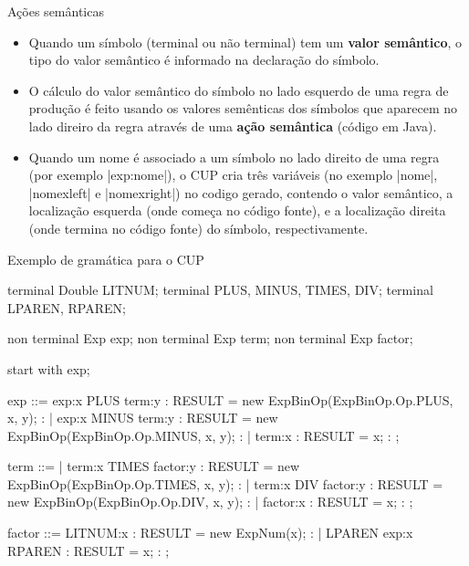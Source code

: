\documentclass[smaller]{beamer}
\begin{document}
\begin{frame}{Ações semânticas}
  \begin{itemize}
    \item Quando um símbolo (terminal ou não terminal) tem um
    \textbf{valor semântico}, o tipo do valor semântico é informado na
    declaração do símbolo.
    \item O cálculo do valor semântico do símbolo no lado esquerdo de
    uma regra de produção é feito usando os valores semênticas dos
    símbolos que aparecem no lado direiro da regra através de uma
    \textbf{ação semântica} (código em Java).
    \item Quando um \alert{nome} é associado a um símbolo no lado
    direito de uma regra (por exemplo \pyginline|exp:nome|), o CUP
    cria três variáveis (no exemplo \pyginline|nome|,
    \pyginline|nomexleft| e \pyginline|nomexright|) no codigo gerado,
    contendo o valor semântico, a localização esquerda (onde começa no
    código fonte), e a localização direita (onde termina no código
    fonte) do símbolo, respectivamente.
  \end{itemize}
\end{frame}


\begin{frame}{Exemplo de gramática para o CUP}
  \scriptsize
\begin{pygmented}[]
terminal Double LITNUM;
terminal        PLUS, MINUS, TIMES, DIV;
terminal        LPAREN, RPAREN;

non terminal Exp exp;
non terminal Exp term;
non terminal Exp factor;

start with exp;

exp ::=
  exp:x PLUS term:y      {: RESULT = new ExpBinOp(ExpBinOp.Op.PLUS, x, y);  :}
| exp:x MINUS term:y     {: RESULT = new ExpBinOp(ExpBinOp.Op.MINUS, x, y); :}
| term:x                 {: RESULT = x;                                     :}
;

term ::=
| term:x TIMES factor:y  {: RESULT = new ExpBinOp(ExpBinOp.Op.TIMES, x, y); :}
| term:x DIV factor:y    {: RESULT = new ExpBinOp(ExpBinOp.Op.DIV, x, y);   :}
| factor:x               {: RESULT = x;                                     :}
;

factor ::=
  LITNUM:x               {: RESULT = new ExpNum(x);                         :}
| LPAREN exp:x RPAREN    {: RESULT = x;                                     :}
;
\end{pygmented}
\end{frame}
\end{document}

